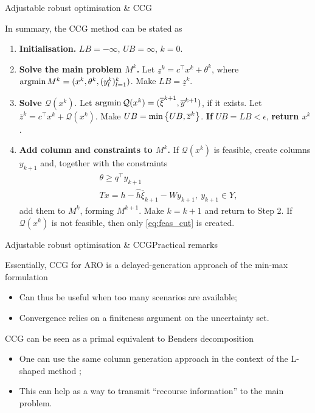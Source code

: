 \begin{frame}{Adjustable robust optimisation \& CCG}

	In summary, the CCG method can be stated as
	\begin{enumerate}[<+->]
		\item {\bf Initialisation.} $LB = -\infty$, $UB = \infty$, $k = 0$.
		\item {\bf Solve the main problem $M^k$.} Let $\underline{z}^k = c^\top x^k + \theta^k$, where $\mathop{\rm argmin} M^k = (x^k, \theta^k, (y_l^k)_{l=1}^k)$. Make $LB = \underline{z}^k$.
	\item {\bf Solve $\mathcal{Q}(x^k)$}. Let $\mathop{\rm argmin} \mathcal{Q}(x^k)=(\overline{\xi}^{k+1}, \overline{y}^{k+1})$, if it exists. Let $\overline{z}^{k} = c^\top x^k + \mathcal{Q}(x^k)$. Make  $UB = \min\left\{ UB, \overline{z}^{k} \right \}$. {\bf If} $UB = LB < \epsilon$, {\bf return $x^k$}.
	\item {\bf Add column and constraints to $M^k$.} If $\mathcal{Q}(x^k)$ is feasible, create columns $y_{k+1}$ and, together with the constraints
		\begin{align}
			& \theta \geq q^\top y_{k+1} \\
			& Tx = h - \hat{h} \overline{\xi}_{k+1} - Wy_{k+1}, \ y_{k+1} \in Y,	 \label{eq:feas_cut}	
		\end{align}
  	add them to $M^k$, forming $M^{k+1}$. Make $k = k+1$ and return to {\color{blue}Step 2}. If $\mathcal{Q}(x^k)$ is not feasible, then only \eqref{eq:feas_cut} is created.
\end{enumerate}
	
\end{frame}


\begin{frame}{Adjustable robust optimisation \& CCG}{Practical remarks}

	Essentially, CCG for ARO is a \alert{delayed-generation} approach of the min-max formulation
	\begin{itemize}
		\item Can thus be useful when \alert{too many scenarios} are available;
		\item Convergence relies on a \alert{finiteness argument} on the uncertainty set.	
	\end{itemize}
	
	\pause
	CCG can be seen as a \alert{primal equivalent} to Benders decomposition
	\begin{itemize}
		\item One can use the same column generation approach in the context of the L-shaped method {\small \cite{van1969shaped}};
		\item This can help as a way to \alert{transmit} ``recourse information'' to the main problem.	
	\end{itemize}

\end{frame}



